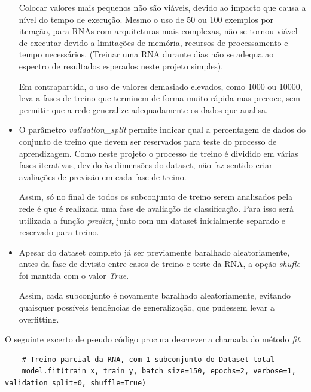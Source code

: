 \begin{itemize}
    Colocar valores mais pequenos não são viáveis, devido ao impacto que causa a nível do tempo de execução.  
    Mesmo o uso de 50 ou 100 exemplos por iteração, para RNAs com arquiteturas mais complexas, não se tornou viável de executar devido a limitações de memória, recursos de processamento e tempo necessários.
    (Treinar uma RNA durante dias não se adequa ao espectro de resultados esperados neste projeto simples).
    
    Em contrapartida, o uso de valores demasiado elevados, como 1000 ou 10000, leva a fases de treino que terminem de forma muito rápida mas precoce, sem permitir que a rede generalize adequadamente os dados que analisa.
    
    \item O parâmetro \textit{validation\_split} permite indicar qual a percentagem de dados do conjunto de treino que devem ser reservados para teste do processo de aprendizagem. 
    Como neste projeto o processo de treino é dividido em várias fases iterativas, devido às dimensões do dataset, não faz sentido criar avaliações de previsão em cada fase de treino. 
    
    Assim, só no final de todos os subconjunto de treino serem analisados pela rede é que é realizada uma fase de avaliação de classificação. Para isso será utilizada a função \textit{predict}, junto com um dataset inicialmente separado e reservado para treino. 
  
    \item Apesar do dataset completo já ser previamente baralhado aleatoriamente, antes da fase de divisão entre casos de treino e teste da RNA, a opção \textit{shufle} foi mantida com o valor \textit{True}. 
    
    Assim, cada subconjunto é novamente baralhado aleatoriamente, evitando quaisquer possíveis tendências de generalização, que pudessem levar a overfitting. 
    
\end{itemize}

O seguinte excerto de pseudo código procura descrever a chamada do método \textit{fit}. 

\begin{verbatim} 
    # Treino parcial da RNA, com 1 subconjunto do Dataset total
    model.fit(train_x, train_y, batch_size=150, epochs=2, verbose=1, validation_split=0, shuffle=True)
\end{verbatim}


